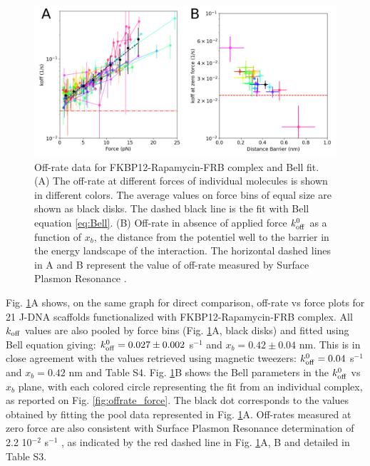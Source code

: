 \documentclass{biophys-new}
\begin{document}
\begin{figure}[hbt!]
	\centering
	\includegraphics[width=0.75\linewidth]{Figures/fig3.png}
	\caption{Off-rate data for FKBP12-Rapamycin-FRB complex and Bell fit. (A) The off-rate at different forces of individual molecules is shown in different colors. The average values on force bins of equal size are shown as black disks. The dashed black line is the fit with Bell equation \ref{eq:Bell}. (B) Off-rate in absence of applied force $k^0_{\rm off}$ as a function of $x_b$, the distance from the potentiel well to the barrier in the energy landscape of the interaction. The horizontal dashed lines in A and B represent the value of off-rate measured by Surface Plasmon Resonance \cite{banaszynski2005}.}
	\label{fig:bell_parameters}	
\end{figure}

Fig. \ref{fig:bell_parameters}A shows, on the same graph for direct comparison, off-rate vs force plots for 21 J-DNA scaffolds functionalized with FKBP12-Rapamycin-FRB complex. All $ k_{\rm off}$ values are also pooled by force bins (Fig. \ref{fig:bell_parameters}A, black disks) and fitted using Bell equation giving: $k^0_{\rm off}=0.027 \pm 0.002$  s$^{-1}$ and $x_b = 0.42 \pm 0.04$ nm. This is in close agreement with the values retrieved using magnetic tweezers: $k^0_{\rm off}=0.04$ s$^{-1}$ and $x_b=0.42$ nm \cite{kostrz2019} and Table S4. Fig. \ref{fig:bell_parameters}B shows the Bell parameters in the $k^0_{\rm off}$ vs $x_b$ plane, with each colored circle representing the fit from an individual complex, as reported on Fig. \ref{fig:offrate_force}. The black dot corresponds to the values obtained by fitting the pool data represented in Fig. \ref{fig:bell_parameters}A. Off-rates measured at zero force are also consistent with Surface Plasmon Resonance determination of 2.2 10$^{-2}$ s$^{-1}$ \cite{banaszynski2005}, as indicated by the red dashed line in Fig. \ref{fig:bell_parameters}A, B and detailed in Table S3.
\end{document}

